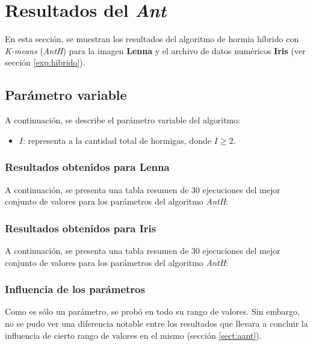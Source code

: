 \section{Resultados del \emph{Ant}}

    En esta sección, se muestran los resultados del algoritmo de hormia híbrido con
\emph{K-means} (\emph{AntH}) para la imagen \textbf{Lenna} y el archivo de datos
numéricos \textbf{Iris} (ver sección \ref{exp:hibrido}).

\subsection{Parámetro variable}\label{sect:iant-pv}

    A continuación, se describe el parámetro variable del algoritmo:
\begin{itemize}
    \item $I$: representa a la cantidad total de hormigas, donde $I \geq 2$.
\end{itemize}

\subsubsection{Resultados obtenidos para \textbf{Lenna}}

    A continuación, se presenta una tabla resumen de 30 ejecuciones del mejor
conjunto de valores para los parámetros del algoritmo \emph{AntH}:



\pagebreak

\subsubsection{Resultados obtenidos para \textbf{Iris}}

    A continuación, se presenta una tabla resumen de 30 ejecuciones del mejor
conjunto de valores para los parámetros del algoritmo \emph{AntH}:



\subsubsection{Influencia de los parámetros}

    Como es sólo un parámetro, se probó en todo su rango de valores. Sin embargo,
no se pudo ver una diferencia notable entre los resultados que llevara a concluir
la influencia de cierto rango de valores en el mismo (sección \ref{sect:aant}).
